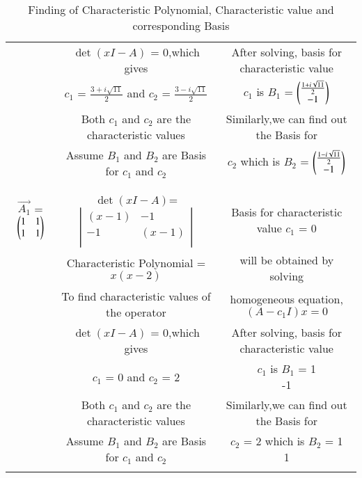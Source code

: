 \documentclass[journal,12pt,twocolumn]{IEEEtran}
\begin{document}
\begin{table*}[ht]
\begin{center}
\begin{tabular}{|c|c|c|}
& $\det(xI-A)$ = 0,which gives & After solving, basis for characteristic value\\
& $c_1$ = $\frac{3+i\sqrt{11}}{2}$ and $c_2$ = $\frac{3-i\sqrt{11}}{2}$&$c_1$ is $B_1$ = $\begin{pmatrix}\frac{1+i\sqrt{11}}{2}\\-1\end{pmatrix}$\\
& Both $c_1$ and $c_2$ are the characteristic values & Similarly,we can find out the Basis for\\
& Assume $B_1$ and $B_2$ are Basis for $c_1$ and $c_2$ & $c_2$ which is $B_2$ = $\begin{pmatrix}\frac{1-i\sqrt{11}}{2}\\-1\end{pmatrix}$\\
& &\\
\hline
& & \\
$\vec{A_1}$ = $\begin{pmatrix}1&1\\
                     1&1\end{pmatrix}$ 
& $\det(xI-A)$= $\left|
                \begin{array}{ccc}
                (x-1) & -1\\
                -1 & (x-1)\\
                \end{array}
                \right|$ & Basis for characteristic value $c_1$ = 0 \\
& Characteristic Polynomial = $x(x-2)$ & will be obtained by solving\\
& To find characteristic values of the operator& homogeneous equation,$(A-c_1I)x = 0$\\
& $\det(xI-A)$ = 0,which gives & After solving, basis for characteristic value\\
& $c_1$ = 0 and $c_2$ = 2 & $c_1$ is $B_1$ = \myvec{1\\-1}\\
& Both $c_1$ and $c_2$ are the characteristic values & Similarly,we can find out the Basis for\\
& Assume $B_1$ and $B_2$ are Basis for $c_1$ and $c_2$ & $c_2$ = 2 which is $B_2$ = \myvec{1\\1} \\
& &\\
\hline
\end{tabular}
\caption{Finding of Characteristic Polynomial, Characteristic value and corresponding Basis}
\label{table:1}
\end{center}
\end{table*}
\end{document}
